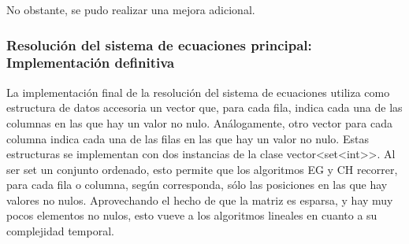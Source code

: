 No obstante, se pudo realizar una mejora adicional.

\subsubsection{Resoluci\'on del sistema de ecuaciones principal: 
Implementaci\'on definitiva}

La implementación final de la resolución del sistema de ecuaciones utiliza como estructura de datos accesoria un vector que, para cada fila, indica cada una de las columnas en las que hay un valor no nulo. Análogamente, otro vector para cada columna indica cada una de las filas en las que hay un valor no nulo. Estas estructuras se implementan con dos instancias de la clase vector<set<int\textgreater\textgreater. Al ser set un conjunto ordenado, esto permite que los algoritmos EG y CH recorrer, para cada fila o columna, según corresponda, sólo las posiciones en las que hay valores no nulos.
Aprovechando el hecho de que la matriz es esparsa, y hay muy pocos elementos no nulos, esto vueve a los algoritmos lineales en cuanto a su complejidad temporal.



